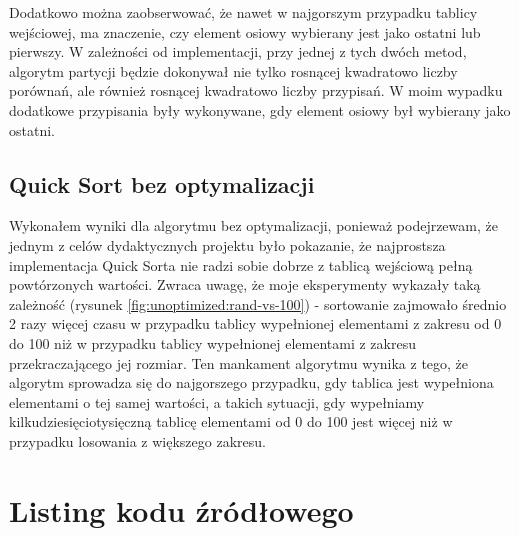\documentclass{article}
\begin{document}
Dodatkowo można zaobserwować, że nawet w najgorszym przypadku tablicy wejściowej, ma znaczenie, czy element osiowy wybierany jest jako ostatni lub pierwszy. W zależności od implementacji, przy jednej z tych dwóch metod, algorytm partycji będzie dokonywał nie tylko rosnącej kwadratowo liczby porównań, ale również rosnącej kwadratowo liczby przypisań. W moim wypadku dodatkowe przypisania były wykonywane, gdy element osiowy był wybierany jako ostatni.

\subsection{Quick Sort bez optymalizacji}
Wykonałem wyniki dla algorytmu bez optymalizacji, ponieważ podejrzewam, że jednym z celów dydaktycznych projektu było pokazanie, że najprostsza implementacja Quick Sorta nie radzi sobie dobrze z tablicą wejściową pełną powtórzonych wartości. Zwraca uwagę, że moje eksperymenty wykazały taką zależność (rysunek \ref{fig:unoptimized:rand-vs-100}) - sortowanie zajmowało średnio 2 razy więcej czasu w przypadku tablicy wypełnionej elementami z zakresu od 0 do 100 niż w przypadku tablicy wypełnionej elementami z zakresu przekraczającego jej rozmiar. Ten mankament algorytmu wynika z tego, że algorytm sprowadza się do najgorszego przypadku, gdy tablica jest wypełniona elementami o tej samej wartości, a takich sytuacji, gdy wypełniamy kilkudziesięciotysięczną tablicę elementami od 0 do 100 jest więcej niż w przypadku losowania z większego zakresu.

\section{Listing kodu źródłowego}

\end{document}

